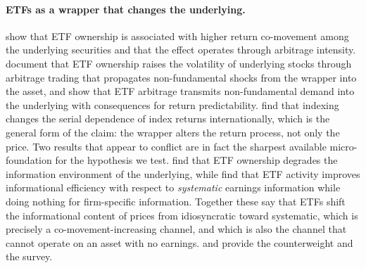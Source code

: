 \documentclass[12pt,a4paper]{article}
\begin{document}
\paragraph{ETFs as a wrapper that changes the underlying.} \citet{da2017exchange} show that ETF ownership is associated with higher return co-movement among the underlying securities and that the effect operates through arbitrage intensity. \citet{bendavid2014do} document that ETF ownership raises the volatility of underlying stocks through arbitrage trading that propagates non-fundamental shocks from the wrapper into the asset, and \citet{brown2020etf} show that ETF arbitrage transmits non-fundamental demand into the underlying with consequences for return predictability. \citet{baltussen2018indexing} find that indexing changes the serial dependence of index returns internationally, which is the general form of the claim: the wrapper alters the return process, not only the price. Two results that appear to conflict are in fact the sharpest available micro-foundation for the hypothesis we test. \citet{israeli2017is} find that ETF ownership degrades the information environment of the underlying, while \citet{glosten2020etf} find that ETF activity improves informational efficiency with respect to \emph{systematic} earnings information while doing nothing for firm-specific information. Together these say that ETFs shift the informational content of prices from idiosyncratic toward systematic, which is precisely a co-movement-increasing channel, and which is also the channel that cannot operate on an asset with no earnings. \citet{coles2022on} and \citet{bendavid2017exchangetraded} provide the counterweight and the survey.
\end{document}
